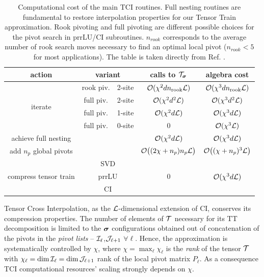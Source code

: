 \begin{table}[ht!]
	\centering
	\small                       %
	\setlength{\tabcolsep}{4pt}  %
  
\begin{adjustbox}{max width=\textwidth} 
	\begin{tabular}{|c|c|c|c|c|}
	\hline 
	action & \multicolumn{2}{c|}{variant} & calls to $\mathcal{T}_{\boldsymbol{\sigma}}$ & algebra cost\tabularnewline
	\hline 
	\hline 
	\multirow{4}{*}{iterate} & rook piv. & 2-site & $\mathcal{O}(\chi^{2}dn_{\text{rook}}\mathcal{L})$ & $\mathcal{O}(\chi^{3}dn_{\text{rook}}\mathcal{L})$\tabularnewline
	\cline{2-5} \cline{3-5} \cline{4-5} \cline{5-5} 
	 & full piv. & 2-site & $\mathcal{O}(\chi^{2}d^{2}\mathcal{L})$ & $\mathcal{O}(\chi^{3}d^{2}\mathcal{L})$\tabularnewline
	\cline{2-5} \cline{3-5} \cline{4-5} \cline{5-5} 
	 & full piv. & 1-site & $\mathcal{O}(\chi^{2}d\mathcal{L})$ & $\mathcal{O}(\chi^{3}d\mathcal{L})$\tabularnewline
	\cline{2-5} \cline{3-5} \cline{4-5} \cline{5-5} 
	 & full piv. & 0-site & 0 & $\mathcal{O}(\chi^{3}\mathcal{L})$\tabularnewline
	\hline 
	achieve full nesting & \multicolumn{2}{c|}{} & $\mathcal{O}(\chi^{2}d\mathcal{L})$ & $\mathcal{O}(\chi^{3}d\mathcal{L})$ \tabularnewline
	\hline 
	add $n_{p}$ global pivots & \multicolumn{2}{c|}{} & $\mathcal{O}\bigl((2\chi+n_{p})n_{p}\mathcal{L}\bigr)$ & $\mathcal{O}\bigl((\chi+n_{p})^{3}\mathcal{L}\bigr)$\tabularnewline
	\hline 
	\multirow{3}{*}{compress tensor train} & \multicolumn{2}{c|}{SVD} & \multirow{3}{*}{0} & \multirow{3}{*}{$\mathcal{O}(\chi^{3}d\mathcal{L})$}\tabularnewline
	\cline{2-3} \cline{3-3} 
	 & \multicolumn{2}{c|}{prrLU} &  & \tabularnewline
	\cline{2-3} \cline{3-3} 
	 & \multicolumn{2}{c|}{CI} &  & \tabularnewline
	\hline 
	\end{tabular}
\end{adjustbox}

\caption{Computational cost of the main TCI routines. Full nesting routines are fundamental to restore  interpolation properties for our Tensor Train approximation. Rook pivoting and full pivoting are different possible choices for the pivot search in prrLU/CI subroutines. $n_{rook}$ corresponds to the average number of rook search moves necessary to find an optimal local pivot ($n_{rook} < 5$ for most applications). The table is taken directly from Ref. \cite{Fernandez2024}.}
\label{tab:cost}
\end{table}	

Tensor Cross Interpolation, as the $\mathcal{L}$-dimensional extension of CI, conserves its compression properties. The number of elements of $\mathcal{T}$ necessary for its TT decomposition is limited to the $\boldsymbol{\sigma}$ configurations obtained out of concatenation of the pivots in the \textit{pivot lists} -- $\mathcal{I}_\ell$,$\mathcal{J}_{\ell +1}$ $\forall \ell$. Hence, the approximation is systematically controlled by $\chi$, where $\chi = \max_{\ell} \chi_\ell$ is the \textit{rank} of the tensor $\mathcal{T}$ with $\chi_\ell = \dim \mathcal{I}_\ell = \dim \mathcal{J}_{\ell +1}$ rank of the local pivot matrix $P_\ell$. As a consequence TCI computational resources' scaling strongly depends on $\chi$.

